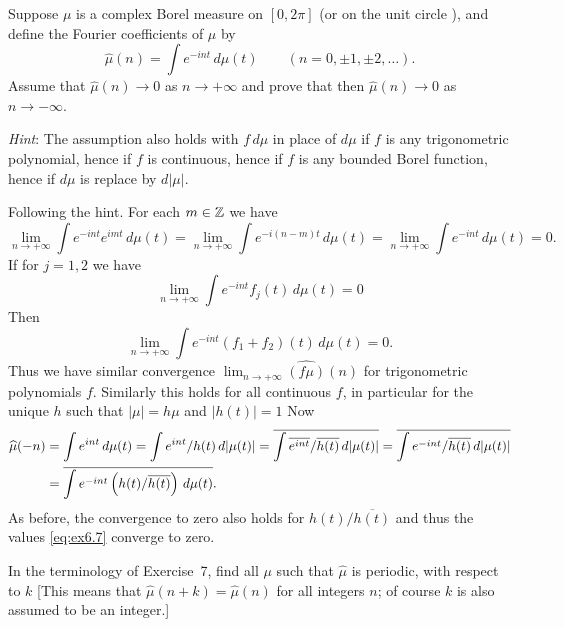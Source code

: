 \begin{enumerate}
\begin{excopy}
Suppose \(\mu\) is a complex Borel measure on \([0,2\pi]\)
(or on the unit circle \T),
and define the Fourier coefficients of \(\mu\) by
\begin{equation*}
\widehat{\mu}(n) = \int e^{-int}\,d\mu(t) \qquad (n=0,\pm 1,\pm 2, \ldots).
\end{equation*}
Assume that \(\widehat{\mu}(n) \to 0 \) as \(n\to +\infty\)
and prove that then
\(\widehat{\mu}(n) \to 0 \) as \(n\to -\infty\).

\emph{Hint}: The assumption also holds with \(f\,d\mu\) in  place of \(d\mu\)
if $f$ is any trigonometric polynomial, hence if $f$ is continuous,
hence if $f$ is any bounded Borel function,
hence if \(d\mu\) is replace by \(d|\mu|\).
\end{excopy}

Following the hint. For each \(m\in\mathbb{Z}\) we have
\begin{equation*}
\lim_{n\to+\infty} \int e^{-int}e^{imt}\,d\mu(t)
= \lim_{n\to+\infty} \int e^{-i(n-m)t}\,d\mu(t)
= \lim_{n\to+\infty} \int e^{-int}\,d\mu(t)
= 0.
\end{equation*}
If for \(j=1,2\) we have
\begin{equation*}
\lim_{n\to+\infty} \int e^{-int}f_j(t)\,d\mu(t) = 0
\end{equation*}
Then
\begin{equation*}
\lim_{n\to+\infty} \int e^{-int}(f_1+f_2)(t)\,d\mu(t) = 0.
\end{equation*}
Thus we have similar convergence \(\lim_{n\to+\infty}\widehat{(f\mu)}(n)\)
for trigonometric polynomials $f$.
Similarly this holds for all continuous $f$, in particular for
the unique $h$ such that \(|\mu| = h\mu\) and \(|h(t)|=1\)
Now
\begin{align}
\widehat{\mu}(-n)
&= \int e^{int}\,d\mu(t)
 = \int e^{int}/h(t)\,d|\mu(t)|
 = \overline{\int \overline{e^{int}}/\overline{h(t)}\,d|\mu(t)|}
 = \overline{\int e^{-int}/\overline{h(t)}\,d|\mu(t)|} \notag \\
&= \overline{\int e^{-int}\left(h(t)/\overline{h(t)}\right)\,d\mu(t)}
   \label{eq:ex6.7}.
\end{align}
As before, the convergence to zero also holds for
\(h(t)/\overline{h(t)}\) and thus the values \eqref{eq:ex6.7}
converge to zero.


\begin{excopy}
In the terminology of Exercise~7, find all \(\mu\) such that
\(\hat{\mu}\) is periodic, with respect to $k$
[This means that \(\hat{\mu}(n+k) = \hat{\mu}(n)\) for all integers $n$;
of course $k$ is also assumed to be an integer.]
\end{excopy}


\end{enumerate}
